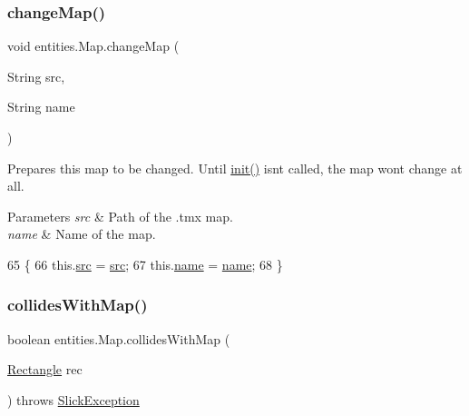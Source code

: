 \subsubsection{\texorpdfstring{change\+Map()}{changeMap()}}
{\footnotesize\ttfamily void entities.\+Map.\+change\+Map (\begin{DoxyParamCaption}\item[{String}]{src,  }\item[{String}]{name }\end{DoxyParamCaption})\hspace{0.3cm}{\ttfamily [inline]}}

Prepares this map to be changed. Until \mbox{\hyperlink{classentities_1_1_map_a183d1b160c442fc50c37cf0cb956f5cd}{init()}} isn\textquotesingle{}t called, the map won\textquotesingle{}t change at all.


\begin{DoxyParams}{Parameters}
{\em src} & Path of the .tmx map. \\
\hline
{\em name} & Name of the map. \\
\hline
\end{DoxyParams}

\begin{DoxyCode}
65                                                    \{
66         this.\mbox{\hyperlink{classentities_1_1_map_a15025d8ae6bb3627fb145ce75013b011}{src}} = \mbox{\hyperlink{classentities_1_1_map_a15025d8ae6bb3627fb145ce75013b011}{src}};
67         this.\mbox{\hyperlink{classentities_1_1_map_a969750cbb3acef375d33040e29be91f0}{name}} = \mbox{\hyperlink{classentities_1_1_map_a969750cbb3acef375d33040e29be91f0}{name}};
68     \}
\end{DoxyCode}
\mbox{\label{classentities_1_1_map_a0dadc6784b338c8aa26adb95568e75fb}} 
\subsubsection{\texorpdfstring{collides\+With\+Map()}{collidesWithMap()}}
{\footnotesize\ttfamily boolean entities.\+Map.\+collides\+With\+Map (\begin{DoxyParamCaption}\item[{\mbox{\hyperlink{classorg_1_1newdawn_1_1slick_1_1geom_1_1_rectangle}{Rectangle}}}]{rec }\end{DoxyParamCaption}) throws \mbox{\hyperlink{classorg_1_1newdawn_1_1slick_1_1_slick_exception}{Slick\+Exception}}\hspace{0.3cm}{\ttfamily [inline]}}


